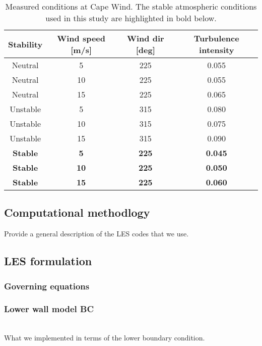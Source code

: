 \begin{table}
\caption{\label{tab:CapeWindMeasurements} Measured conditions at Cape
  Wind.  The stable atmospheric conditions used in this study are
  highlighted in bold below.} \centering
\begin{tabular}{cccc}
  \hline
  Stability    & Wind speed [m/s] & Wind dir [deg] & Turbulence intensity \\
  \hline
  Neutral      & 5                & 225            & 0.055           \\
  Neutral      & 10               & 225            & 0.055           \\
  Neutral      & 15               & 225            & 0.065           \\
  Unstable     & 5                & 315            & 0.080           \\
  Unstable     & 10               & 315            & 0.075           \\
  Unstable     & 15               & 315            & 0.090           \\
  \bf{Stable}  & \bf{5}           & \bf{225}       & \bf{0.045}      \\
  \bf{Stable}  & \bf{10}          & \bf{225}       & \bf{0.050}      \\
  \bf{Stable}  & \bf{15}          & \bf{225}       & \bf{0.060}      \\
\hline
\end{tabular}
\end{table}


\subsection{Computational methodlogy}
Provide a general description of the LES codes that we use.

\subsection{LES formulation}

\subsubsection{Governing equations}

\subsubsection{Lower wall model BC}
\\
What we implemented in terms of the lower boundary condition.

